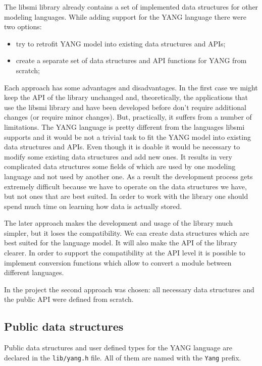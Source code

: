\documentclass[conference]{IEEEtran}
\begin{document}
The libsmi library already contains a set of implemented data structures for other modeling languages. While adding support for the YANG language there were two options:
\begin{itemize}
\item try to retrofit YANG model into existing data structures and APIs;
\item create a separate set of data structures and API functions for YANG from scratch;
\end{itemize}

Each approach has some advantages and disadvantages. In the first case we might keep the API of the library unchanged and, theoretically, the applications that use the libsmi library and have been developed before don't require additional changes (or require minor changes). But, practically, it suffers from a number of limitations. The YANG language is pretty different from the languages libsmi supports and it would be not a trivial task to fit the YANG model into existing data structures and APIs. Even though it is doable it would be necessary to modify some existing data structures and add new ones. It results in very complicated data structures some fields of which are used by one modeling language and not used by another one. As a result the development process gets extremely difficult because we have to operate on the data structures we have, but not ones that are best suited. In order to work with the library one should spend much time on learning how  data is actually stored. 

The later approach makes the development and usage of the library much simpler, but it loses the compatibility. We can create data structures which are best suited for the language model. It will also make the API of the library clearer. In order to support the compatibility at the API level it is possible to implement conversion functions which allow to convert a module between different languages. 

In the project the second approach was chosen: all necessary data structures and the public API were defined from scratch.

\subsection{Public data structures}
Public data structures and user defined types for the YANG language are declared in the \texttt{lib/yang.h} file. All of them are named with the \texttt{Yang} prefix. 
\end{document}
